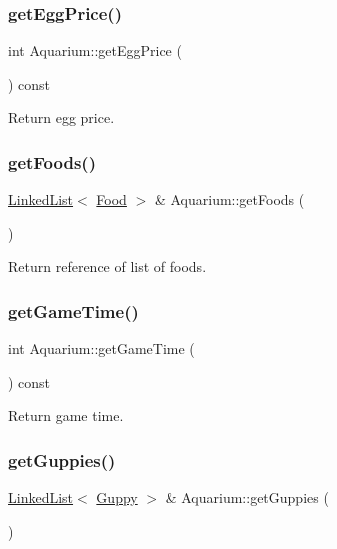 \subsubsection{\texorpdfstring{get\+Egg\+Price()}{getEggPrice()}}
{\footnotesize\ttfamily int Aquarium\+::get\+Egg\+Price (\begin{DoxyParamCaption}{ }\end{DoxyParamCaption}) const}



Return egg price. 

\mbox{\label{class_aquarium_a919dd5ccffd5fe1469544c74b5f26ee7}} 
\subsubsection{\texorpdfstring{get\+Foods()}{getFoods()}}
{\footnotesize\ttfamily \mbox{\hyperlink{class_linked_list}{Linked\+List}}$<$ \mbox{\hyperlink{class_food}{Food}} $>$ \& Aquarium\+::get\+Foods (\begin{DoxyParamCaption}{ }\end{DoxyParamCaption})}



Return reference of list of foods. 

\mbox{\label{class_aquarium_aac0206880d410aec571cfc10b8ceae46}} 
\subsubsection{\texorpdfstring{get\+Game\+Time()}{getGameTime()}}
{\footnotesize\ttfamily int Aquarium\+::get\+Game\+Time (\begin{DoxyParamCaption}{ }\end{DoxyParamCaption}) const}



Return game time. 

\mbox{\label{class_aquarium_a9214dfeb37c333eb3f95f8fc50adb933}} 
\subsubsection{\texorpdfstring{get\+Guppies()}{getGuppies()}}
{\footnotesize\ttfamily \mbox{\hyperlink{class_linked_list}{Linked\+List}}$<$ \mbox{\hyperlink{class_guppy}{Guppy}} $>$ \& Aquarium\+::get\+Guppies (\begin{DoxyParamCaption}{ }\end{DoxyParamCaption})}



